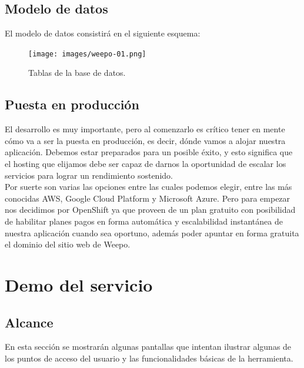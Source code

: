 \documentclass[oneside]{book}
\begin{document}
\newpage



\section{Modelo de datos}

El modelo de datos consistir\'{a} en el siguiente esquema:
	
\begin{figure}[H]
	\centering
	\texttt{[image: images/weepo-01.png]}
	\medskip
	\caption{Tablas de la base de datos.}
	\medskip
\end{figure}	
	
\newpage


\section{Puesta en producción}

El desarrollo es muy importante, pero al comenzarlo es crítico tener en mente cómo va a ser la puesta en producción, es decir, dónde vamos a alojar nuestra aplicación. Debemos estar preparados para un posible éxito, y esto significa que el hosting que elijamos debe ser capaz de darnos la oportunidad de escalar los servicios para lograr un rendimiento sostenido.\\
Por suerte son varias las opciones entre las cuales podemos elegir, entre las más conocidas AWS, Google Cloud Platform y Microsoft Azure. Pero para empezar nos decidimos por OpenShift ya que proveen de un plan gratuito con posibilidad de habilitar planes pagos en forma automática y escalabilidad instantánea de nuestra aplicación cuando sea oportuno, además poder apuntar en forma gratuita el dominio del sitio web de Weepo.

\newpage




%
%
\chapter{Demo del servicio}


\section{Alcance}

En esta secci\'{o}n se mostrar\'{a}n algunas pantallas que intentan ilustrar algunas de los puntos de acceso del usuario y las funcionalidades b\'{a}sicas de la herramienta.
\bigskip
\end{document}
